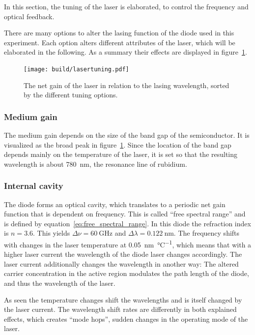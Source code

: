 In this section, the tuning of the laser is elaborated,
to control the frequency and optical feedback.

There are many options to alter the lasing function of the diode used in this experiment.
Each option alters different attributes of the laser, which will be elaborated in the following.
As a summary their effects are displayed in figure~\ref{fig:lasertuning}.
\begin{figure}[ht]
  \centering
  \texttt{[image: build/lasertuning.pdf]}
  \caption{The net gain of the laser in relation to the lasing wavelength, sorted by the different
  tuning options\cite{anleitung}.}%
  \label{fig:lasertuning}
\end{figure}

\subsubsection{Medium gain}\label{medium-gain}
The medium gain depends on the size of the band gap of the semiconductor.
It is visualized as the broad peak in figure~\ref{fig:lasertuning}.
Since the location of the band gap depends mainly on the temperature of the laser,
it is set so that the resulting wavelength is about \SI{780}{\nano\meter},
the resonance line of rubidium.

\subsubsection{Internal cavity}\label{internal-cavity}
The diode forms an optical cavity, which translates to a periodic net gain function
that is dependent on frequency.
This is called \enquote{free spectral range} and is defined by
equation~\eqref{eq:free_spectral_range}.
In this diode the refraction index is $n = \num{3.6}$\cite{anleitung}.
This yields $\Delta \nu = \SI{60}{\giga\hertz}$ and $\Delta \lambda = \SI{0.122}{\nano\meter}$.
The frequency shifts with changes in the laser temperature at \SI{0.05}{\nano\meter\per\celsius},
which means that with a higher laser current the wavelength of the diode laser changes accordingly.
The laser current additionally changes the wavelength in another way:
The altered carrier concentration in the active region modulates the path length of the diode,
and thus the wavelength of the laser.

As seen the temperature changes shift the wavelengths and is itself changed by the laser current.
The wavelength shift rates are differently in both explained effects, which creates \enquote{mode
hops}, sudden changes in the operating mode of the laser.

